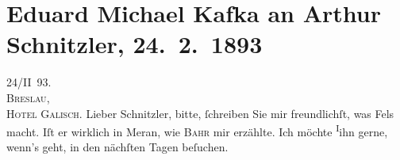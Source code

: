 

         
         \newcommand{\erwaehntePersonen}{Personen: Hermann Bahr, Friedrich Michael Fels, Adalbert von Goldschmidt, Hugo von Hofmannsthal, Felix Hollaender, Josef Jarno, Arthur Levysohn, Gilbert Otto Neumann-Hofer, Emanuel Reicher, Rudolf Rittner}
         \newcommand{\erwaehnteInstitutionen}{Institutionen: Berliner Tageblatt, Literarisches Bureau Clemens Freyer, Magazin für die Literatur des Auslandes}
         \newcommand{\erwaehnteOrte}{Orte: Berlin, Breslau, Hamburg, Hotel Galisch, Meran, München, Schillingstraße, Szklarska Poręba, Wien, Wilhelmstraße}
         \newcommand{\erwaehnteWerke}{Werke: Anatol, Der Talisman. Dramatisches Märchen, Die Frage an das Schicksal, Familie, Gaea. Musikdrama, Sterben. Novelle}
               \section[Eduard Michael Kafka an Arthur Schnitzler, 24. 2. 1893]{ Eduard Michael Kafka an Arthur Schnitzler, 24. 2. 1893}\nopagebreak{}\rehead{ }\begin{ledgroupsized}[t]{13cm}\normalsize\beginnumbering \toendnotes[C]{\smallbreak\pagebreak[2]} 
\toendnotes[C]{\smallbreak}\pstart
           \raggedleft{}{\pb}24/II 93.{\\}\textsc{Breslau},{\\}\textsc{Hotel Galisch}.\pend
           \pstart{}Lieber Schnitzler,\pend\pstart
           bitte, ſchreiben Sie mir freundlichſt, was Fels
               macht. Iſt er wirklich in Meran, wie \textsc{Bahr} mir erzählte. Ich möchte \substVorne{}\textsuperscript{I}\substDazwischen{}i\substHinten{}hn gerne, wenn’s geht, in den nächſten Tagen beſuchen.\pend
           \pstart

\end{ledgroupsized}
